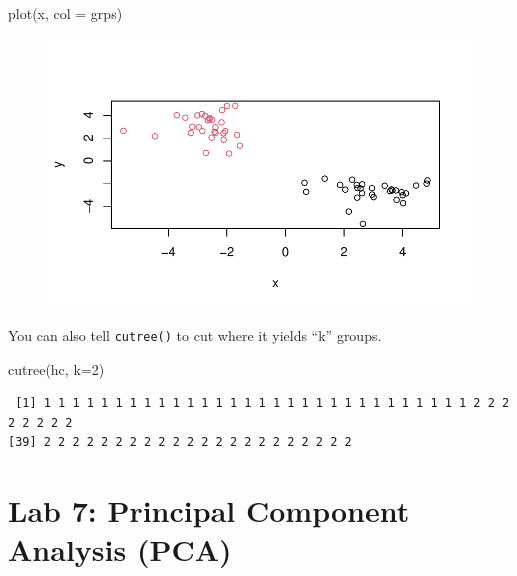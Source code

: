 \documentclass[
  letterpaper,
  DIV=11,
  numbers=noendperiod]{scrartcl}
\newenvironment{Shaded}{\begin{snugshade}}{\end{snugshade}}
\newcommand{\AttributeTok}[1]{\textcolor[rgb]{0.40,0.45,0.13}{#1}}
\newcommand{\DecValTok}[1]{\textcolor[rgb]{0.68,0.00,0.00}{#1}}
\newcommand{\FunctionTok}[1]{\textcolor[rgb]{0.28,0.35,0.67}{#1}}
\newcommand{\NormalTok}[1]{\textcolor[rgb]{0.00,0.23,0.31}{#1}}
\begin{document}
\begin{Shaded}
\begin{Highlighting}[]
\FunctionTok{plot}\NormalTok{(x, }\AttributeTok{col =}\NormalTok{ grps)}
\end{Highlighting}
\end{Shaded}

\begin{figure}[H]

{\centering \includegraphics{Lab-7_files/figure-pdf/unnamed-chunk-14-1.pdf}

}

\end{figure}

You can also tell \texttt{cutree()} to cut where it yields ``k'' groups.

\begin{Shaded}
\begin{Highlighting}[]
\FunctionTok{cutree}\NormalTok{(hc, }\AttributeTok{k=}\DecValTok{2}\NormalTok{)}
\end{Highlighting}
\end{Shaded}

\begin{verbatim}
 [1] 1 1 1 1 1 1 1 1 1 1 1 1 1 1 1 1 1 1 1 1 1 1 1 1 1 1 1 1 1 1 2 2 2 2 2 2 2 2
[39] 2 2 2 2 2 2 2 2 2 2 2 2 2 2 2 2 2 2 2 2 2 2
\end{verbatim}

\hypertarget{lab-7-principal-component-analysis-pca}{%
\section{Lab 7: Principal Component Analysis
(PCA)}\label{lab-7-principal-component-analysis-pca}}
\end{document}
